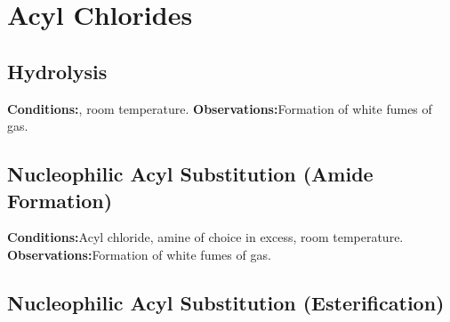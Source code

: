 	\section{Acyl Chlorides}

		\subsection{Hydrolysis}

			\vspace{1.5em}
			\vbox{\textbf{Conditions:}\tabto{35mm}, room temperature.}
			\vbox{\textbf{Observations:}\tabto{35mm}Formation of white fumes of  gas.}





		\subsection{Nucleophilic Acyl Substitution (Amide Formation)}

			\vspace{1.5em}
			\vbox{\textbf{Conditions:}\tabto{35mm}Acyl chloride, amine of choice in excess, room temperature.}
			\vbox{\textbf{Observations:}\tabto{35mm}Formation of white fumes of  gas.}





		\subsection{Nucleophilic Acyl Substitution (Esterification)}

